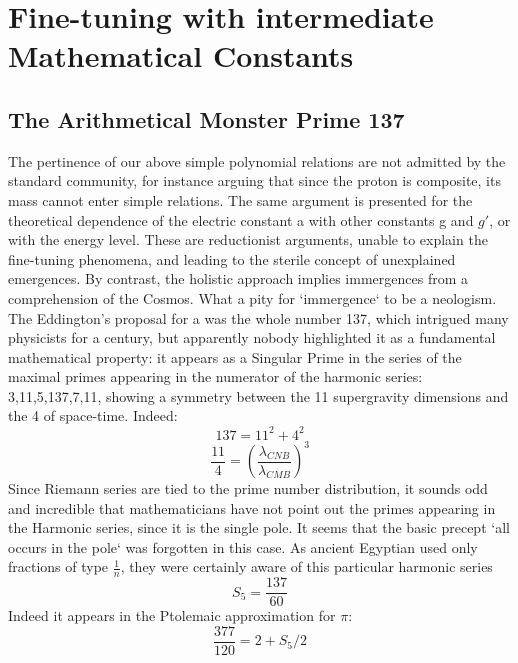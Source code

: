 \documentclass[twoside,draft]{article}
\begin{document}
\begin{sloppypar}
{\section{Fine-tuning with intermediate Mathematical Constants}
\subsection{The Arithmetical Monster Prime 137}

The pertinence of our above simple polynomial relations are not admitted by the standard
community, for instance arguing that since the proton is composite, its mass cannot enter simple
relations. The same argument is presented for the theoretical dependence of the electric constant a
with other constants g and $g\prime$, or with the energy level. These are reductionist arguments, unable to explain the fine-tuning phenomena, and leading to the sterile concept of unexplained emergences.
By contrast, the holistic approach implies immergences from a comprehension of the Cosmos. What a
pity for `immergence` to be a neologism.
The Eddington's proposal for a was the whole number 137, which intrigued many physicists for a
century, but apparently nobody highlighted it as a fundamental mathematical property: it appears as a
Singular Prime in the series of the maximal primes appearing in the numerator of the harmonic
series: 3,11,5,137,7,11, showing a symmetry between the 11 supergravity dimensions and the 4 of
space-time. Indeed:
\begin{equation}
137 = 11^{2} + 4^{2}
\end{equation}
\begin{equation}
\frac{11}{4} = (\frac{\lambda_{CNB}}{\lambda_{CMB}})^{3}
\end{equation}
Since Riemann series are tied to the prime number distribution, it sounds odd and incredible that mathematicians
have not point out the primes appearing in the Harmonic series, since it is the single pole. It seems
that the basic precept `all occurs in the pole` was forgotten in this case. As ancient Egyptian used
only fractions of type $\frac{1}{n}$, they were certainly aware of this particular harmonic series 
\begin{equation}
S_{5} = \frac{137}{60}
\end{equation}
Indeed it appears in the Ptolemaic approximation for $\pi$: 
\begin{equation}
\frac{377}{120} = 2 + S_{5}/2
\end{equation}
}
\end{sloppypar}
\end{document}
